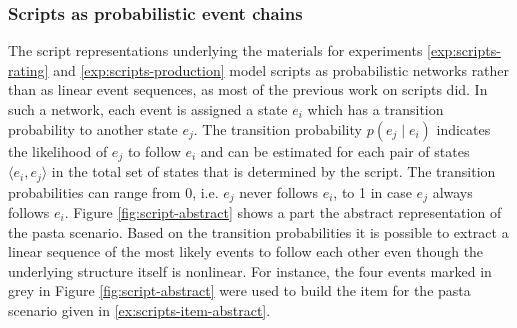 \subsubsection{Scripts as probabilistic event chains}
The script representations underlying the materials for experiments \ref{exp:scripts-rating} and \ref{exp:scripts-production} model scripts as probabilistic networks rather than as linear event sequences, as most of the previous work on scripts did. In such a network, each event is assigned a state $e_i$ which has a transition probability to another state $e_j$. The transition probability $p(e_j\mathbin{|}e_i)$ indicates the likelihood of $e_j$ to follow $e_i$ and can be estimated for each pair of states $\langle e_i,e_j\rangle$ {}in the total set of states that is determined by the script. The transition probabilities can range from 0, i.e. $e_j$ never follows $e_i$, to 1 in case $e_j$ always follows $e_i$. Figure \ref{fig:script-abstract} shows a part the abstract representation of the pasta scenario. Based on the transition probabilities it is possible to extract a linear sequence of the most likely events to follow each other even though the underlying structure itself is nonlinear. For instance, the four events marked in grey in Figure \ref{fig:script-abstract} were used to build the item for the pasta scenario given in \ref{ex:scripts-item-abstract}.

